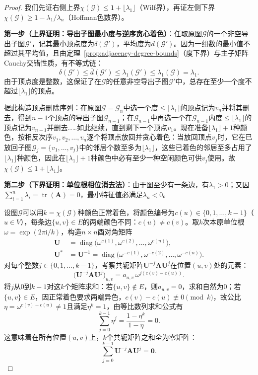 \begin{proof}
我们先证右侧上界$\chi(\mathcal G)\leq 1+\lfloor\lambda_1\rfloor$（Wilf界），再证左侧下界$\chi(\mathcal G)\geq 1-\lambda_1/\lambda_n$（Hoffman色数界）。

\textbf{第一步（上界证明：导出子图最小度与逆序贪心着色）}：任取原图$\mathcal G$的一个非空导出子图$\mathcal G'$，记其最小顶点度为$\delta(\mathcal G')$，平均度为$\overline d(\mathcal G')$。因为一组数的最小值不超过其平均值，且由定理~\ref{prop:adjacency-degree-bounds}（度下界）与主子矩阵Cauchy交错性质，有不等式链：
\[
\delta(\mathcal G')
\leq\overline d(\mathcal G')
\leq\lambda_1(\mathcal G')
\leq\lambda_1(\mathcal G)=\lambda_1.
\]
由于顶点度是整数，这保证了在$\mathcal G$的任意非空导出子图$\mathcal G'$中，总存在至少一个度不超过$\lfloor\lambda_1\rfloor$的顶点。

据此构造顶点删除序列：在原图$\mathcal G=\mathcal G_n$中选一个度$\leq\lfloor\lambda_1\rfloor$的顶点记为$v_n$并将其删去，得到$n-1$个顶点的导出子图$\mathcal G_{n-1}$；在$\mathcal G_{n-1}$中再选一个在$\mathcal G_{n-1}$内度$\leq\lfloor\lambda_1\rfloor$的顶点记为$v_{n-1}$并删去……如此继续，直到剩下一个顶点$v_1$。现在准备$\lfloor\lambda_1\rfloor+1$种颜色，按相反次序$v_1,v_2,\ldots,v_n$逐个将顶点放回并贪心着色：当放回顶点$v_j$时，它在已放回子图$\mathcal G_j=\{v_1,\ldots,v_j\}$中的邻居个数至多为$\lfloor\lambda_1\rfloor$，这些已着色的邻居至多占用了$\lfloor\lambda_1\rfloor$种颜色，因此在$\lfloor\lambda_1\rfloor+1$种颜色中必有至少一种空闲颜色可供$v_j$使用。故$\chi(\mathcal G)\leq 1+\lfloor\lambda_1\rfloor$。

\textbf{第二步（下界证明：单位根相位消去法）}：由于图至少有一条边，有$\lambda_1>0$；又因$\sum_{i=1}^n\lambda_i=\operatorname{tr}(\bm A)=0$，最小特征值必满足$\lambda_n<0$。

设图$\mathcal G$可以用$k=\chi(\mathcal G)$种颜色正常着色，将颜色编号为$c(u)\in\{0,1,\ldots,k-1\}$（$u\in V$），每条边$\{u,v\}\in E$的两端颜色不同：$c(u)\neq c(v)$。取$k$次本原单位根$\omega=\exp(2\pi\mathrm i/k)$，构造$n\times n$酉对角矩阵
\[
\begin{aligned}
\bm U&=\operatorname{diag}\bigl(\omega^{c(1)},\omega^{c(2)},\ldots,\omega^{c(n)}\bigr),\\
\bm U^*&=\bm U^{-1}=\operatorname{diag}\bigl(\omega^{-c(1)},\omega^{-c(2)},\ldots,\omega^{-c(n)}\bigr).
\end{aligned}
\]
对每个整数$j\in\{0,1,\ldots,k-1\}$，考察共轭矩阵$\bm U^{-j}\bm A\bm U^j$在位置$(u,v)$处的元素：
\[
\bigl(\bm U^{-j}\bm A\bm U^j\bigr)_{u,v}
=a_{u,v}\,\omega^{j(c(v)-c(u))}.
\]
将$j$从$0$到$k-1$对这$k$个矩阵求和：若$\{u,v\}\notin E$，则$a_{u,v}=0$，求和自然为$0$；若$\{u,v\}\in E$，因正常着色要求两端异色，$c(v)-c(u)\not\equiv 0\pmod k$，故公比$\eta=\omega^{c(v)-c(u)}\neq 1$且满足$\eta^k=1$，由等比数列求和公式有
\[
\sum_{j=0}^{k-1}\eta^j=\frac{1-\eta^k}{1-\eta}=0.
\]
这意味着在所有位置$(u,v)$上，$k$个共轭矩阵之和全为零矩阵：
\begin{equation}
\sum_{j=0}^{k-1}\bm U^{-j}\bm A\bm U^j=\bm 0.
\label{eq:adjacency-chromatic-phase-cancellation}
\end{equation}


\end{proof}
